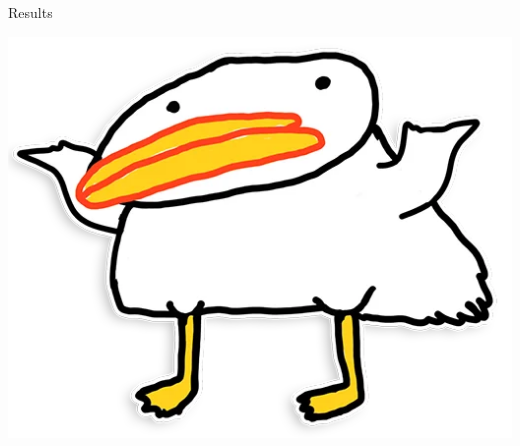 \begin{frame}{Results}
\begin{minipage}[t][3cm][t]{0.48\linewidth}
        \pause
        \vspace{0.2cm}
        \includegraphics[scale = 0.05]{pics/utia-hz.png}
    \end{minipage}
\end{frame}